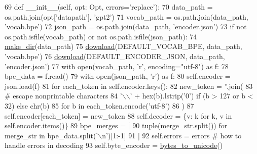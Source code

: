 \begin{DoxyCode}
69     \textcolor{keyword}{def }\_\_init\_\_(self, opt: Opt, errors=\textcolor{stringliteral}{'replace'}):
70         data\_path = os.path.join(opt[\textcolor{stringliteral}{'datapath'}], \textcolor{stringliteral}{'gpt2'})
71         vocab\_path = os.path.join(data\_path, \textcolor{stringliteral}{'vocab.bpe'})
72         json\_path = os.path.join(data\_path, \textcolor{stringliteral}{'encoder.json'})
73         \textcolor{keywordflow}{if} \textcolor{keywordflow}{not} os.path.isfile(vocab\_path) \textcolor{keywordflow}{or} \textcolor{keywordflow}{not} os.path.isfile(json\_path):
74             \hyperlink{namespaceparlai_1_1core_1_1build__data_a6ce042fedd4194bd016845bbe7a8facf}{make\_dir}(data\_path)
75             \hyperlink{namespaceparlai_1_1core_1_1build__data_ab74f0e428f05e5d91fa93c8afb367622}{download}(DEFAULT\_VOCAB\_BPE, data\_path, \textcolor{stringliteral}{'vocab.bpe'})
76             \hyperlink{namespaceparlai_1_1core_1_1build__data_ab74f0e428f05e5d91fa93c8afb367622}{download}(DEFAULT\_ENCODER\_JSON, data\_path, \textcolor{stringliteral}{'encoder.json'})
77         with open(vocab\_path, \textcolor{stringliteral}{'r', encoding="utf-8") as f:}
78 \textcolor{stringliteral}{            bpe\_data = f.read()}
79 \textcolor{stringliteral}{        with open(json\_path, 'r') as f:}
80 \textcolor{stringliteral}{            self.encoder = json.load(f)}
81 \textcolor{stringliteral}{        }\textcolor{keywordflow}{for} each\_token \textcolor{keywordflow}{in} self.encoder.keys():
82             new\_token = \textcolor{stringliteral}{''}.join(
83                 \textcolor{comment}{# escape nonprintable characters}
84                 \textcolor{stringliteral}{'\(\backslash\)\(\backslash\)'} + hex(b).lstrip(\textcolor{stringliteral}{'0'}) \textcolor{keywordflow}{if} (b > 127 \textcolor{keywordflow}{or} b < 32) \textcolor{keywordflow}{else} chr(b)
85                 \textcolor{keywordflow}{for} b \textcolor{keywordflow}{in} each\_token.encode(\textcolor{stringliteral}{'utf-8'})
86             )
87             self.encoder[each\_token] = new\_token
88         self.decoder = \{v: k \textcolor{keywordflow}{for} k, v \textcolor{keywordflow}{in} self.encoder.items()\}
89         bpe\_merges = [
90             tuple(merge\_str.split()) \textcolor{keywordflow}{for} merge\_str \textcolor{keywordflow}{in} bpe\_data.split(\textcolor{stringliteral}{'\(\backslash\)n'})[1:-1]
91         ]
92         self.errors = errors  \textcolor{comment}{# how to handle errors in decoding}
93         self.byte\_encoder = \hyperlink{namespaceparlai_1_1core_1_1gpt2__helper_ae992d8ce81708900b1b1bb81bc7a816d}{bytes\_to\_unicode}()

\end{DoxyCode}
